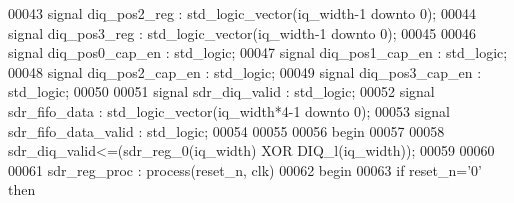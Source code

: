 \begin{DoxyCode}
00043 \textcolor{keywordflow}{signal} \textcolor{vhdlchar}{diq_pos2_reg}         \textcolor{vhdlchar}{:} \textcolor{comment}{std\_logic\_vector}\textcolor{vhdlchar}{(}\textcolor{vhdlchar}{iq_width}\textcolor{vhdlchar}{-}\textcolor{vhdllogic}{}\textcolor{vhdllogic}{1} \textcolor{keywordflow}{downto} \textcolor{vhdllogic}{}\textcolor{vhdllogic}{0}\textcolor{vhdlchar}{)};
00044 \textcolor{keywordflow}{signal} \textcolor{vhdlchar}{diq_pos3_reg}        \textcolor{vhdlchar}{:} \textcolor{comment}{std\_logic\_vector}\textcolor{vhdlchar}{(}\textcolor{vhdlchar}{iq_width}\textcolor{vhdlchar}{-}\textcolor{vhdllogic}{}\textcolor{vhdllogic}{1} \textcolor{keywordflow}{downto} \textcolor{vhdllogic}{}\textcolor{vhdllogic}{0}\textcolor{vhdlchar}{)};
00045 
00046 \textcolor{keywordflow}{signal} \textcolor{vhdlchar}{diq_pos0_cap_en}      \textcolor{vhdlchar}{:} \textcolor{comment}{std\_logic};
00047 \textcolor{keywordflow}{signal} \textcolor{vhdlchar}{diq_pos1_cap_en}      \textcolor{vhdlchar}{:} \textcolor{comment}{std\_logic};
00048 \textcolor{keywordflow}{signal} \textcolor{vhdlchar}{diq_pos2_cap_en}      \textcolor{vhdlchar}{:} \textcolor{comment}{std\_logic};
00049 \textcolor{keywordflow}{signal} \textcolor{vhdlchar}{diq_pos3_cap_en}      \textcolor{vhdlchar}{:} \textcolor{comment}{std\_logic};
00050 
00051 \textcolor{keywordflow}{signal} \textcolor{vhdlchar}{sdr_diq_valid}        \textcolor{vhdlchar}{:} \textcolor{comment}{std\_logic};
00052 \textcolor{keywordflow}{signal} \textcolor{vhdlchar}{sdr_fifo_data}            \textcolor{vhdlchar}{:} \textcolor{comment}{std\_logic\_vector}\textcolor{vhdlchar}{(}\textcolor{vhdlchar}{iq_width}\textcolor{vhdlchar}{*}\textcolor{vhdllogic}{4-1} \textcolor{keywordflow}{downto} \textcolor{vhdllogic}{}\textcolor{vhdllogic}{0}\textcolor{vhdlchar}{)};
00053 \textcolor{keywordflow}{signal} \textcolor{vhdlchar}{sdr_fifo_data_valid}  \textcolor{vhdlchar}{:} \textcolor{comment}{std\_logic};
00054 
00055  
00056 \textcolor{vhdlkeyword}{begin}
00057 
00058 \textcolor{vhdlchar}{sdr_diq_valid}\textcolor{vhdlchar}{<=}\textcolor{vhdlchar}{(}\textcolor{vhdlchar}{sdr_reg_0}\textcolor{vhdlchar}{(}\textcolor{vhdlchar}{iq_width}\textcolor{vhdlchar}{)} \textcolor{keywordflow}{XOR} \textcolor{vhdlchar}{DIQ_l}\textcolor{vhdlchar}{(}\textcolor{vhdlchar}{iq_width}\textcolor{vhdlchar}{)}\textcolor{vhdlchar}{)};
00059 
00060 
00061  sdr\_reg\_proc : \textcolor{keywordflow}{process}(reset_n, clk)
00062 \textcolor{vhdlkeyword}{    begin}
00063       \textcolor{keywordflow}{if} \textcolor{vhdlchar}{reset_n}\textcolor{vhdlchar}{=}\textcolor{vhdlchar}{'}\textcolor{vhdllogic}{}\textcolor{vhdllogic}{0}\textcolor{vhdlchar}{'} \textcolor{keywordflow}{then}

\end{DoxyCode}
